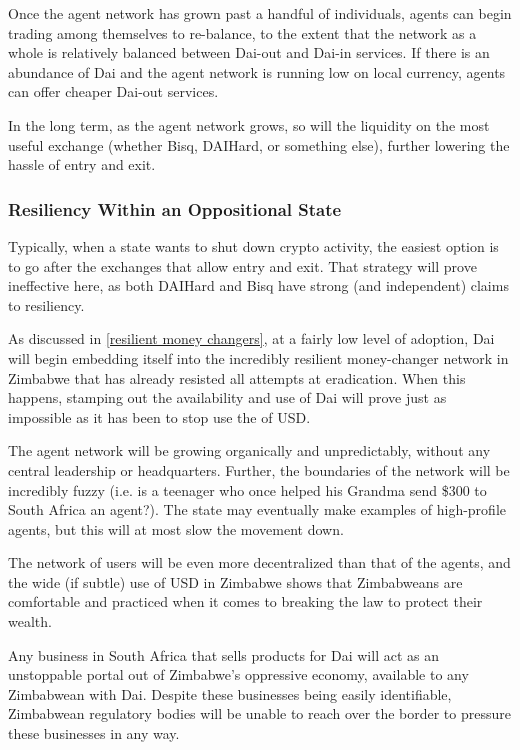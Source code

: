 \documentclass{article}
\begin{document}
Once the agent network has grown past a handful of individuals, agents can begin trading among themselves to re-balance, to the extent that the network as a whole is relatively balanced between Dai-out and Dai-in services. If there is an abundance of Dai and the agent network is running low on local currency, agents can offer cheaper Dai-out services.

In the long term, as the agent network grows, so will the liquidity on the most useful exchange (whether Bisq, DAIHard, or something else), further lowering the hassle of entry and exit.

\subsubsection{Resiliency Within an Oppositional State} \label{state resilient}

Typically, when a state wants to shut down crypto activity, the easiest option is to go after the exchanges that allow entry and exit. That strategy will prove ineffective here, as both DAIHard and Bisq have strong (and independent) claims to resiliency.

As discussed in \ref{resilient money changers}, at a fairly low level of adoption, Dai will begin embedding itself into the incredibly resilient money-changer network in Zimbabwe that has already resisted all attempts at eradication. When this happens, stamping out the availability and use of Dai will prove just as impossible as it has been to stop use the of USD.

The agent network will be growing organically and unpredictably, without any central leadership or headquarters. Further, the boundaries of the network will be incredibly fuzzy (i.e. is a teenager who once helped his Grandma send \$300 to South Africa an agent?). The state may eventually make examples of high-profile agents, but this will at most slow the movement down.

The network of users will be even more decentralized than that of the agents, and the wide (if subtle) use of USD in Zimbabwe shows that Zimbabweans are comfortable and practiced when it comes to breaking the law to protect their wealth.

Any business in South Africa that sells products for Dai will act as an unstoppable portal out of Zimbabwe's oppressive economy, available to any Zimbabwean with Dai. Despite these businesses being easily identifiable, Zimbabwean regulatory bodies will be unable to reach over the border to pressure these businesses in any way.
\end{document}

